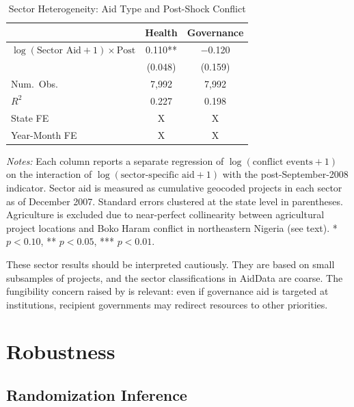 \documentclass[12pt]{article}
\begin{document}
\begin{table}[H]
\centering
\caption{Sector Heterogeneity: Aid Type and Post-Shock Conflict}
\label{tab:sector_het}
\begin{tabular}{lcc}
\toprule
 & Health & Governance \\
\midrule
$\log(\text{Sector Aid} + 1) \times \text{Post}$ & 0.110** & $-$0.120 \\
 & (0.048) & (0.159) \\
\midrule
Num.\ Obs. & 7,992 & 7,992 \\
$R^2$ & 0.227 & 0.198 \\
State FE & X & X \\
Year-Month FE & X & X \\
\bottomrule
\end{tabular}
\par\vspace{0.3em}
{\footnotesize \emph{Notes:} Each column reports a separate regression of $\log(\text{conflict events} + 1)$ on the interaction of $\log(\text{sector-specific aid} + 1)$ with the post-September-2008 indicator. Sector aid is measured as cumulative geocoded projects in each sector as of December 2007. Standard errors clustered at the state level in parentheses. Agriculture is excluded due to near-perfect collinearity between agricultural project locations and Boko Haram conflict in northeastern Nigeria (see text). * $p < 0.10$, ** $p < 0.05$, *** $p < 0.01$.}
\end{table}

These sector results should be interpreted cautiously. They are based on small subsamples of projects, and the sector classifications in AidData are coarse. The fungibility concern raised by \citet{feyzioglu1998fungibility} is relevant: even if governance aid is targeted at institutions, recipient governments may redirect resources to other priorities.


\section{Robustness}
\label{sec:robustness}

\subsection{Randomization Inference}
\end{document}
